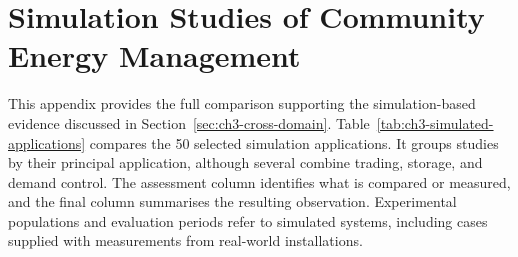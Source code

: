 \chapter{Simulation Studies of Community Energy Management}
\label{app:simulation-studies}

This appendix provides the full comparison supporting the simulation-based evidence discussed in Section~\ref{sec:ch3-cross-domain}. Table~\ref{tab:ch3-simulated-applications} compares the 50 selected simulation applications. It groups studies by their principal application, although several combine trading, storage, and demand control. The assessment column identifies what is compared or measured, and the final column summarises the resulting observation. Experimental populations and evaluation periods refer to simulated systems, including cases supplied with measurements from real-world installations.

